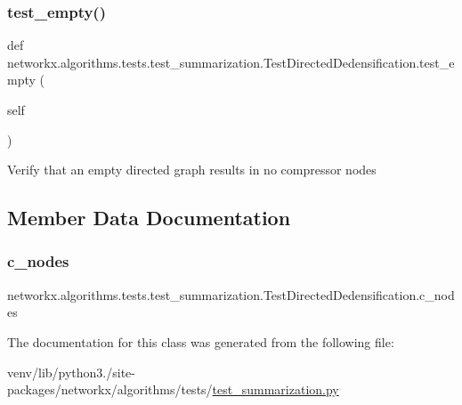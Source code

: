 \subsubsection{\texorpdfstring{test\+\_\+empty()}{test\_empty()}}
{\footnotesize\ttfamily def networkx.\+algorithms.\+tests.\+test\+\_\+summarization.\+Test\+Directed\+Dedensification.\+test\+\_\+empty (\begin{DoxyParamCaption}\item[{}]{self }\end{DoxyParamCaption})}

\begin{DoxyVerb}Verify that an empty directed graph results in no compressor nodes
\end{DoxyVerb}
 

\subsection{Member Data Documentation}
\mbox{\label{classnetworkx_1_1algorithms_1_1tests_1_1test__summarization_1_1TestDirectedDedensification_abdd65ffa6f578b005bc68520c755ede0}} 
\subsubsection{\texorpdfstring{c\+\_\+nodes}{c\_nodes}}
{\footnotesize\ttfamily networkx.\+algorithms.\+tests.\+test\+\_\+summarization.\+Test\+Directed\+Dedensification.\+c\+\_\+nodes}



The documentation for this class was generated from the following file\+:\begin{DoxyCompactItemize}
\item 
venv/lib/python3./site-\/packages/networkx/algorithms/tests/\hyperlink{test__summarization_8py}{test\+\_\+summarization.\+py}\end{DoxyCompactItemize}
